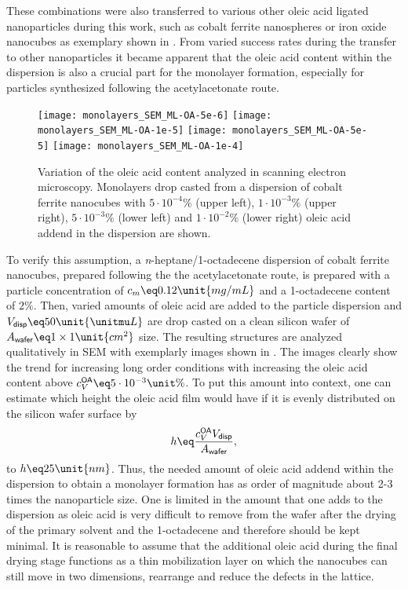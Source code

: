 \documentclass[\main/dresen_thesis.tex]{subfiles}
\begin{document}
  These combinations were also transferred to various other oleic acid ligated nanoparticles during this work, such as cobalt ferrite nanospheres or iron oxide nanocubes as exemplary shown in .
  From varied success rates during the transfer to other nanoparticles it became apparent that the oleic acid content within the dispersion is also a crucial part for the monolayer formation, especially for particles synthesized following the acetylacetonate route.

  \begin{figure}[tb]
    \centering
    \texttt{[image: monolayers\_SEM\_ML-OA-5e-6]}
    \texttt{[image: monolayers\_SEM\_ML-OA-1e-5]}
    \texttt{[image: monolayers\_SEM\_ML-OA-5e-5]}
    \texttt{[image: monolayers\_SEM\_ML-OA-1e-4]}
    \caption{\label{fig:monolayers:preparation:solventVariation:OAAddend}Variation of the oleic acid content analyzed in scanning electron microscopy. Monolayers drop casted from a dispersion of cobalt ferrite nanocubes with $5\cdot10^{-4} \unit{\%}$ (upper left), $1\cdot10^{-3} \unit{\%}$ (upper right), $5\cdot10^{-3} \unit{\%}$ (lower left) and $1\cdot10^{-2} \unit{\%}$ (lower right) oleic acid addend in the dispersion are shown.}
  \end{figure}

  To verify this assumption, a \textit{n}-heptane/1-octadecene dispersion of cobalt ferrite nanocubes, prepared following the the acetylacetonate route, is prepared with a particle concentration of $c_m \eq 0.12 \unit{mg/mL}$ and a 1-octadecene content of $2\unit{\%}$.
  Then, varied amounts of oleic acid are added to the particle dispersion and $V_\textsf{disp} \eq 50 \unit{\unitmu L}$ are drop casted on a clean silicon wafer of $ A_\textsf{wafer} \eq 1 \times 1 \unit{cm^2}$ size.
  The resulting structures are analyzed qualitatively in SEM with exemplarly images shown in .
  The images clearly show the trend for increasing long order conditions with increasing the oleic acid content above $c_V^\textsf{OA} \eq 5\cdot10^{-3} \unit{\%}$.
  To put this amount into context, one can estimate which height the oleic acid film would have if it is evenly distributed on the silicon wafer surface by
  \begin{align}
    h \eq \frac{c_V^\textsf{OA} V_\textsf{disp}}{A_\textsf{wafer}}, \label{eq:monolayers:preparation:solventVariation:OAAddend}
  \end{align}
  to $h \eq 25 \unit{nm}$.
  Thus, the needed amount of oleic acid addend within the dispersion to obtain a monolayer formation has as order of magnitude about 2-3 times the nanoparticle size.
  One is limited in the amount that one adds to the dispersion as oleic acid is very difficult to remove from the wafer after the drying of the primary solvent and the 1-octadecene and therefore should be kept minimal.
  It is reasonable to assume that the additional oleic acid during the final drying stage functions as a thin mobilization layer on which the nanocubes can still move in two dimensions, rearrange and reduce the defects in the lattice.
\end{document}
